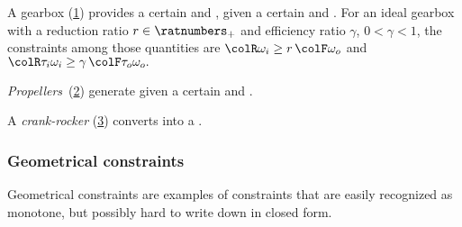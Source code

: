 \begin{example}
    A gearbox (\cref{fig:gearbox}) provides a certain  and , given a certain
     and . For
    an ideal gearbox with a reduction ratio $r \in \ratnumbers_+$ and
    efficiency ratio $\gamma$, $0<\gamma<1$, the constraints among
    those quantities are ${\colR \omega_i}\geq r\,{\colF \omega_o}$
    and ${\colR \tau_i\omega_i}\geq\gamma\,{\colF \tau_o\omega_o}.$
\end{example}
\begin{figure}[h]
    \begin{center}
    \end{center}
    \caption{}
    \label{fig:gearbox}
\end{figure}


\begin{example}
    \emph{Propellers}~(\cref{fig:propeller}) generate 
    given a certain  and .
\end{example}
\begin{figure}[h]
    \begin{center}
    \end{center}
    \caption{\label{fig:propeller}}
\end{figure}

\begin{example}
    A \emph{crank-rocker} (\cref{fig:crack}) converts  into a .
\end{example}
\begin{figure}[h]
    \centering
    \caption{\label{fig:crack}}
\end{figure}

\subsubsection{Geometrical constraints}

Geometrical constraints are examples of constraints that are easily recognized as monotone, but possibly hard to write down in closed form.

